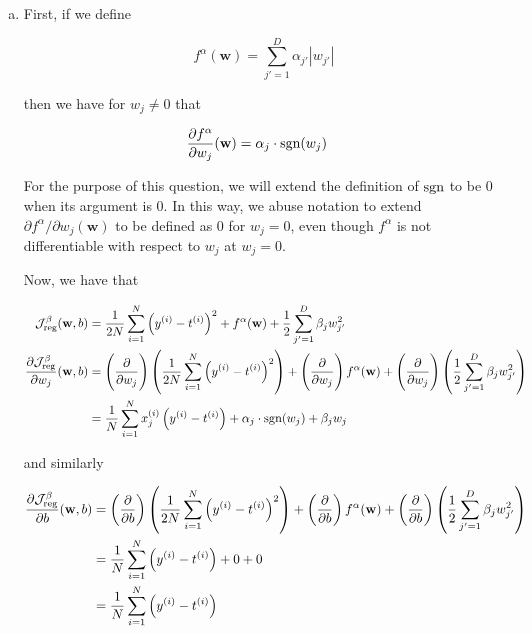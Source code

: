 \documentclass{article}
\begin{document}
\begin{enumerate}[(a)]
    \item First, if we define 
    
    \[f^\alpha(\mathbf{w}) = \sum_{j' = 1}^D \alpha_{j'} |w_{j'}|\]

    then we have for $w_j \neq 0$ that 

    \begin{align*}
        \frac{\partial f^\alpha}{\partial w_j}(\mathbf{w}) &= \alpha_j \cdot \mathcal{\text{sgn}}(w_j)
    \end{align*}

    For the purpose of this question, we will extend the definition of $\mathcal{\text{sgn}}$ to be 0 when its argument is 0. In this way, we abuse notation to extend $\partial f^\alpha/\partial w_j(\mathbf{w})$ to be defined as $0$ for $w_j = 0$, even though $f^\alpha$ is not differentiable with respect to $w_j$ at $w_j = 0$.

    Now, we have that

    \begin{align*}
        \mathcal{J}^{\beta}_{\text{reg}}(\mathbf{w}, b) &= \frac{1}{2N} \sum_{i = 1}^N \left(y^{(i)} - t^{(i)}\right)^2 + f^\alpha(\mathbf{w}) + \frac{1}{2} \sum_{j' = 1}^D \beta_j w_{j'}^2\\
        \frac{\partial \mathcal{J}^{\beta}_{\text{reg}}}{\partial w_j}(\mathbf{w}, b) &= \left(\frac{\partial}{\partial w_j}\right) \left(\frac{1}{2N} \sum_{i = 1}^N \left(y^{(i)} - t^{(i)}\right)^2\right) + \left(\frac{\partial}{\partial w_j}\right) f^\alpha(\mathbf{w}) + \left(\frac{\partial}{\partial w_j}\right) \left(\frac{1}{2} \sum_{j' = 1}^D \beta_j w_{j'}^2\right)\\
       &=  \frac{1}{N} \sum_{i = 1}^N x_j^{(i)} \left(y^{(i)} - t^{(i)}\right) + \alpha_j \cdot \mathcal{\text{sgn}}(w_j) + \beta_j w_j
    \end{align*}

    and similarly 

    \begin{align*}
        \frac{\partial \mathcal{J}^{\beta}_{\text{reg}}}{\partial b}(\mathbf{w}, b) &= \left(\frac{\partial}{\partial b}\right) \left(\frac{1}{2N} \sum_{i = 1}^N \left(y^{(i)} - t^{(i)}\right)^2\right) + \left(\frac{\partial}{\partial b}\right) f^\alpha(\mathbf{w}) + \left(\frac{\partial}{\partial b}\right) \left(\frac{1}{2} \sum_{j' = 1}^D \beta_j w_{j'}^2\right)\\
         &=  \frac{1}{N} \sum_{i = 1}^N \left(y^{(i)} - t^{(i)}\right) + 0 + 0\\
         &= \frac{1}{N} \sum_{i = 1}^N \left(y^{(i)} - t^{(i)}\right)
    \end{align*}


\end{enumerate}
\end{document}
